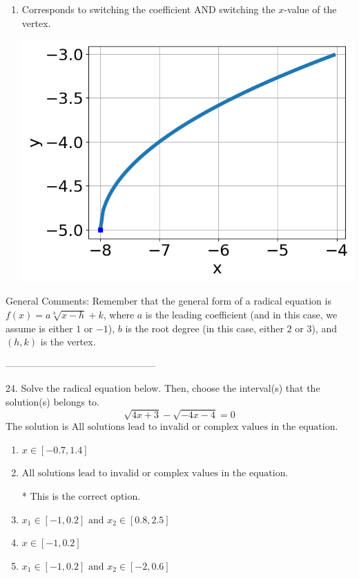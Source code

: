 \documentclass{article}[10pt]
\begin{document}
\begin{enumerate}[label=\Alph*.]
\item Corresponds to switching the coefficient AND switching the $x$-value of the vertex. 
\begin{center}\includegraphics[scale=0.5]{../Figures/question23AC.png}\end{center} 
 
\end{enumerate} 
 
General Comments: Remember that the general form of a radical equation is $ f(x) = a \sqrt[b]{x - h} + k$, where $a$ is the leading coefficient (and in this case, we assume is either $1$ or $-1$), $b$ is the root degree (in this case, either $2$ or $3$), and $(h, k)$ is the vertex.

-----------------------------------------------

24. Solve the radical equation below. Then, choose the interval(s) that the solution(s) belongs to.
$$ \sqrt{4 x + 3} - \sqrt{-4 x - 4} = 0 $$ 
The solution is $ \text{All solutions lead to invalid or complex values in the equation.} $ 

\begin{enumerate}[label=\Alph*.] 
\item $ x \in [-0.7,1.4] $ 

  
\item $ \text{All solutions lead to invalid or complex values in the equation.} $ 

 * This is the correct option. 
\item $ x_1 \in [-1, 0.2] \text{ and } x_2 \in [0.8,2.5] $ 

  
\item $ x \in [-1,0.2] $ 

  
\item $ x_1 \in [-1, 0.2] \text{ and } x_2 \in [-2,0.6] $ 

  
\end{enumerate} 
 
\end{document}
